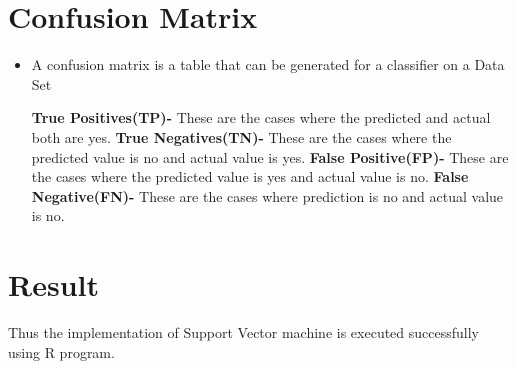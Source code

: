 \documentclass[a4paper,10pt]{article}
\begin{document}
\section{Confusion Matrix}
\begin{itemize}
\item A confusion matrix is a table that can be generated for a classifier on a Data Set 

\textbf{True Positives(TP)-} These are the cases where the predicted and actual both are yes.
\linebreak
\textbf{True Negatives(TN)-} These are the cases where the predicted value is no and actual value is yes.
\linebreak
\textbf{False Positive(FP)-} These are the cases where the predicted value is yes and actual value is no.
\linebreak
\textbf{False Negative(FN)-} These are the cases where prediction is no and actual value is no.
\end{itemize}

\section{Result}
Thus the implementation of Support Vector machine is executed successfully using R program.
\end{document}
